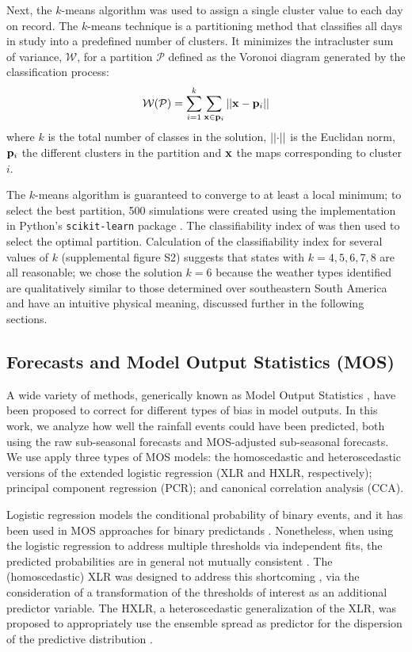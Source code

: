 \documentclass[twocol]{ametsoc}
\begin{document}
Next, the $k$-means algorithm was used to assign a single cluster value to each day on record.
The $k$-means technique is a partitioning method that classifies all days in study into a predefined number of clusters.
It minimizes the intracluster sum of variance, $\mathcal{W}$, for a partition $\mathcal{P}$ defined as the Voronoi diagram generated by the classification process:
\begin{equation}
	\mathcal{W} \qty( \mathcal{P} ) = \sum_{i=1}^{k}\sum_{\vb{x} \in \vb{p}_{i}} \abs{\abs{\vb{x} - \vb{p}_i}}
\end{equation}
where $k$ is the total number of classes in the solution, $\abs{\abs{\cdot}}$ is the Euclidan norm, $\vb{p}_i$ the different clusters in the partition and $\vb{x}$ the maps corresponding to cluster $i$.

The $k$-means algorithm is guaranteed to converge to at least a local minimum; to select the best partition, 500 simulations were created using the implementation in Python's \texttt{scikit-learn} package \citep{Pedregosa:2012tv}.
The classifiability index of \citet{Michelangeli1995} was then used to select the optimal partition.
Calculation of the classifiability index for several values of $k$ (supplemental figure S2) suggests that states with $k=4,5,6,7,8$ are all reasonable; we chose the solution $k=6$ because the weather types identified are qualitatively similar to those determined over southeastern South America \citep{Munoz2015,Munoz2016} and have an intuitive physical meaning, discussed further in the following sections.

\subsection{Forecasts and Model Output Statistics (MOS)}

A wide variety of methods, generically known as Model Output Statistics \citep[MOS;][]{Glahn:1972vt}, have been proposed to correct for different types of bias in model outputs.
In this work, we analyze how well the rainfall events could have been predicted, both using the raw sub-seasonal forecasts and  MOS-adjusted sub-seasonal forecasts.
We use apply three types of MOS models: the homoscedastic and heteroscedastic versions of the extended logistic regression (XLR and HXLR, respectively); principal component regression (PCR); and canonical correlation analysis (CCA).

Logistic regression models the conditional probability of binary events, and it has been used in MOS approaches for binary predictands \citep{Hamill:2004hk}.
Nonetheless, when using the logistic regression to address multiple thresholds via independent fits, the predicted probabilities are in general not mutually consistent \citep{Messner:2014gp}.
The (homoscedastic) XLR was designed to address this shortcoming \citep{Wilks:2009bk}, via the consideration of a transformation of the thresholds of interest as an additional predictor variable.
The HXLR, a heteroscedastic generalization of the XLR, was proposed to appropriately use the ensemble spread as predictor for the dispersion of the predictive distribution \citep{Messner:2014gp}.
\end{document}
